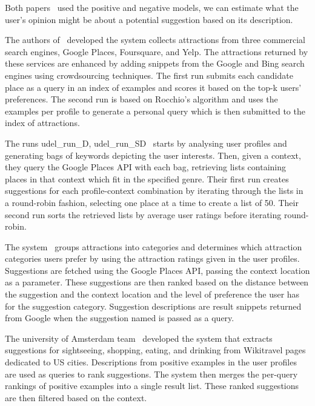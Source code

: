 \documentclass{llncs}
\begin{document}
Both papers~\cite{Yang_2013,Rikitianskii_2013} used the positive and negative models, we can estimate what the user's opinion might be about a potential suggestion based on its description.

The authors of~\cite{Drosatos_2013} developed the system collects attractions from three commercial search engines, Google Places, Foursquare, and Yelp.
The attractions returned by these services are enhanced by adding snippets from the Google and Bing search
engines using crowdsourcing techniques. The first run submits each candidate place as a query in an index of
examples and scores it based on the top-k users' preferences. The second run is based on Rocchio's algorithm and uses the examples per profile to generate a personal query which is then submitted to the index of attractions.

The runs udel\_run\_D, udel\_run\_SD~\cite{Bellogin_2013} starts by analysing user profiles and generating bags of keywords depicting the user interests.
Then, given a context, they query the Google Places API with each bag, retrieving lists containing places
in that context which fit in the specified genre. Their first run creates suggestions for each profile-context
combination by iterating through the lists in a round-robin fashion, selecting one place at a time to create a
list of 50. Their second run sorts the retrieved lists by average user ratings before iterating round-robin.

The system~\cite{Roy_2013} groups attractions into categories and determines which attraction categories users prefer by
using the attraction ratings given in the user profiles. Suggestions are fetched using the Google Places API,
passing the context location as a parameter. These suggestions are then ranked based on the distance between
the suggestion and the context location and the level of preference the user has for the suggestion category.
Suggestion descriptions are result snippets returned from Google when the suggestion named is passed as a
query.

The university of Amsterdam team~\cite{Bellogin_2013} developed the system that extracts suggestions for sightseeing, shopping, eating, and drinking from Wikitravel pages dedicated to US cities. Descriptions from positive examples in the user profiles are used as queries to rank suggestions. The system then merges the per-query rankings of positive examples into a single result list.
These ranked suggestions are then filtered based on the context.
\end{document}
